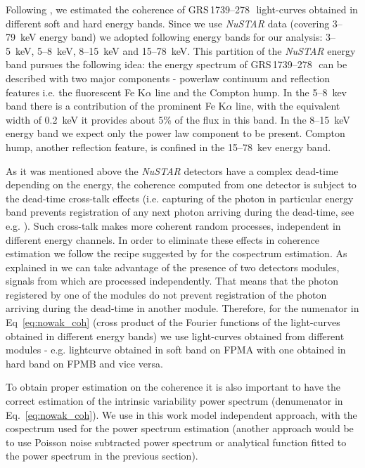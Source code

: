 \documentclass[a4paper,fleqn,usenatbib]{mnras}
\def\grs{{GRS\,1739--278\,}}
\begin{document}
Following , we estimated the coherence of \grs\ light-curves obtained in different soft and hard energy bands. 
Since we use {\it NuSTAR} data (covering 3--79~keV energy band) we adopted following energy bands for our analysis: 3--5~keV, 5--8~keV, 8--15~keV and 15--78~keV.
This partition of the {\it NuSTAR} energy band pursues the following idea: the energy spectrum of \grs\ can be described with two major components - powerlaw continuum and reflection features i.e. the fluorescent Fe K$\alpha$ line and the Compton hump.
In the 5--8~kev band there is a contribution of the prominent Fe K$\alpha$ line, with the equivalent width of 0.2~keV it provides about 5\% of the flux in this band.
In the 8--15~keV energy band we expect only the power law component to be present.
Compton hump, another reflection feature, is confined in the 15--78~kev energy band. 

As it was mentioned above the {\it NuSTAR} detectors have a complex dead-time depending on the energy, the coherence computed from one detector is subject to the dead-time cross-talk effects (i.e. capturing of the photon in particular energy band prevents registration of any next photon arriving during the dead-time, see e.g. \citet{2015MNRAS.451.4253R}). 
Such cross-talk makes more coherent random processes, independent in different energy channels.
In order to eliminate these effects in coherence estimation we follow the recipe suggested by \citet{2015ApJ...800..109B} for the cospectrum estimation. 
As explained in \citep{2015ApJ...800..109B} we can take advantage of the presence of two detectors modules, signals from which are processed independently. 
That means that the photon registered by one of the modules do not prevent registration of the photon arriving during the dead-time in another module. 
Therefore, for the numenator in Eq~\ref{eq:nowak_coh} (cross product of the Fourier functions of the light-curves obtained in different energy bands) we use light-curves obtained from different modules - e.g. lightcurve obtained in soft band on FPMA with one obtained in hard band on FPMB and vice versa.

To obtain proper estimation on the coherence it is also important to have the correct estimation of the intrinsic variability power spectrum (denumenator in Eq.~\ref{eq:nowak_coh}).
We use in this work model independent approach, with the cospectrum used for the power spectrum estimation (another approach would be to use Poisson noise subtracted power spectrum or analytical function fitted to the power spectrum in the previous section).
\end{document}
